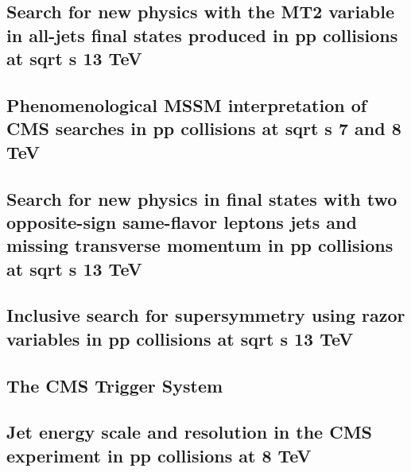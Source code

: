 \documentclass[a4paper, 11pt, twoside, openright]{report}
\begin{document}
\subsection{Search for new physics with the MT2 variable in all-jets final states produced in pp collisions at sqrt s 13 TeV}


\subsection{Phenomenological MSSM interpretation of CMS searches in pp collisions at sqrt s 7 and 8 TeV}


\subsection{Search for new physics in final states with two opposite-sign same-flavor leptons jets and missing transverse momentum in pp collisions at sqrt s 13 TeV}


\subsection{Inclusive search for supersymmetry using razor variables in pp collisions at  sqrt s 13 TeV}


\subsection{The CMS Trigger System}


\subsection{Jet energy scale and resolution in the CMS experiment in pp collisions at 8 TeV}

\end{document}
